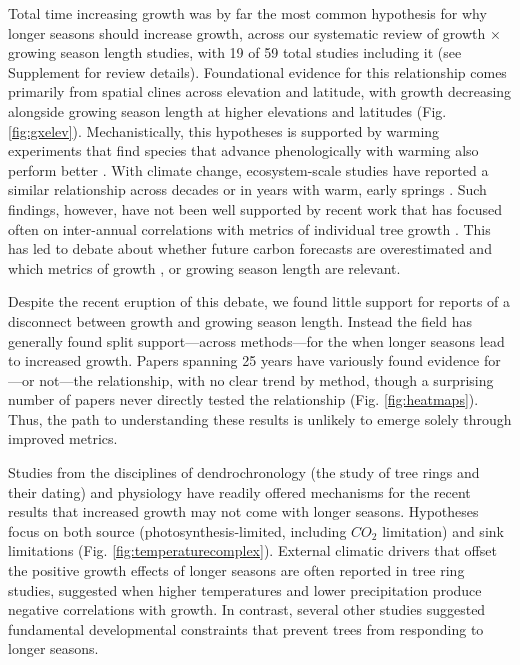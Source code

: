 \documentclass[11pt]{article}
\begin{document}
Total time increasing growth was by far the most common hypothesis for why longer seasons should increase growth, across our systematic review of growth $\times$ growing season length studies, with 19 of 59 total studies including it (see Supplement for review details). Foundational evidence for this relationship comes primarily from spatial clines across elevation and latitude, with growth decreasing alongside growing season length at higher elevations and latitudes (Fig. \ref{fig:gxelev}). Mechanistically, this hypotheses is supported by warming experiments that find species that advance phenologically with warming also perform better \citep[with performance most often measured by growth,][]{Cleland:2012}. With climate change, ecosystem-scale studies have reported a similar relationship across decades \citep{keenan2014net} or in years with warm, early springs \citep{chen1999effects}. Such findings, however, have not been well supported by recent work that has focused often on inter-annual correlations with metrics of individual tree growth \citep{dow2022warm,silvestro2023longer}. This has led to debate about whether future carbon forecasts are overestimated and which metrics of growth \citep{green2022limits}, or growing season length \cite{korner2023four} are relevant.

Despite the recent eruption of this debate, we found little support for reports of a disconnect between growth and growing season length. Instead the field has generally found split support---across methods---for the when longer seasons lead to increased growth. Papers spanning 25 years have variously found evidence for---or not---the relationship, with no clear trend by method, though a surprising number of papers never directly tested the relationship (Fig. \ref{fig:heatmaps}). Thus, the path to understanding these results is unlikely to emerge solely through improved metrics. 

Studies from the disciplines of dendrochronology (the study of tree rings and their dating) and physiology have readily offered mechanisms for the recent results that increased growth may not come with longer seasons. Hypotheses focus on both source (photosynthesis-limited, including $CO_2$ limitation) and sink limitations (Fig. \ref{fig:temperaturecomplex}). External climatic drivers that offset the positive growth effects of longer seasons are often reported in tree ring studies, suggested when higher temperatures and lower precipitation produce negative correlations with growth. In contrast, several other studies suggested fundamental developmental constraints that prevent trees from responding to longer seasons. 
\end{document}
